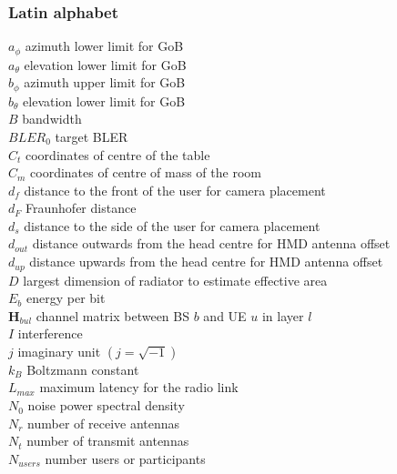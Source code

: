 \subsubsection*{Latin alphabet}
$a_\phi$ \mytab azimuth lower limit for \acs{GoB}\\
$a_\theta$ \mytab elevation lower limit for \acs{GoB}\\
$b_\phi$ \mytab azimuth upper limit for \acs{GoB}\\
$b_\theta$ \mytab elevation lower limit for \acs{GoB} \\
$B$ \mytab bandwidth \\
$BLER_0$ \mytab target \acs{BLER} \\
$C_t$ \mytab coordinates of centre of the table \\
$C_m$ \mytab coordinates of centre of mass of the room \\
$d_f$ \mytab distance to the front of the user for camera placement \\
$d_F$ \mytab Fraunhofer distance \\
$d_s$ \mytab distance to the side of the user for camera placement \\
$d_{out}$ \mytab distance outwards from the head centre for \acs{HMD} antenna offset\\
$d_{up}$ \mytab distance upwards from the head centre for \acs{HMD} antenna offset\\
$D$ \mytab largest dimension of radiator to estimate effective area \\
$E_b$ \mytab energy per bit \\
$\bm{H}_{bul}$ \mytab channel matrix between BS $b$ and UE $u$ in layer $l$\\
$I$ \mytab interference\\
$j$ \mytab imaginary unit $\left(j = \sqrt{-1}\right)$\\
$k_B$ \mytab Boltzmann constant\\
$L_{max}$ \mytab maximum latency for the radio link \\
$N_0$ \mytab noise power spectral density \\
$N_r$ \mytab number of receive antennas \\
$N_t$ \mytab number of transmit antennas \\
$N_{users}$ \mytab number users or participants \\
